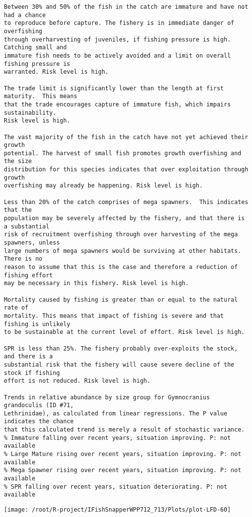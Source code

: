 \documentclass{report}\usepackage[]{graphicx}\usepackage[]{color}
\makeatletter
\def\maxwidth{ %
  \ifdim\Gin@nat@width>\linewidth
    \linewidth
  \else
    \Gin@nat@width
  \fi
}
\newenvironment{kframe}{%
 \def\at@end@of@kframe{}%
 \ifinner\ifhmode%
  \def\at@end@of@kframe{\end{minipage}}%
  \begin{minipage}{\columnwidth}%
 \fi\fi%
 \def\FrameCommand##1{\hskip\@totalleftmargin \hskip-\fboxsep
 \colorbox{shadecolor}{##1}\hskip-\fboxsep
     \hskip-\linewidth \hskip-\@totalleftmargin \hskip\columnwidth}%
 \MakeFramed {\advance\hsize-\width
   \@totalleftmargin\z@ \linewidth\hsize
   \@setminipage}}%
 {\par\unskip\endMakeFramed%
 \at@end@of@kframe}
\newenvironment{knitrout}{}{} %
\makeatother
\begin{document}
\begin{knitrout}
\begin{kframe}
\begin{verbatim}
Between 30% and 50% of the fish in the catch are immature and have not had a chance
to reproduce before capture. The fishery is in immediate danger of overfishing
through overharvesting of juveniles, if fishing pressure is high.  Catching small and
immature fish needs to be actively avoided and a limit on overall fishing pressure is
warranted. Risk level is high.

The trade limit is significantly lower than the length at first maturity.  This means
that the trade encourages capture of immature fish, which impairs sustainability.
Risk level is high.

The vast majority of the fish in the catch have not yet achieved their growth
potential. The harvest of small fish promotes growth overfishing and the size
distribution for this species indicates that over exploitation through growth
overfishing may already be happening. Risk level is high.

Less than 20% of the catch comprises of mega spawners.  This indicates that the
population may be severely affected by the fishery, and that there is a substantial
risk of recruitment overfishing through over harvesting of the mega spawners, unless
large numbers of mega spawners would be surviving at other habitats. There is no
reason to assume that this is the case and therefore a reduction of fishing effort
may be necessary in this fishery. Risk level is high.
 
Mortality caused by fishing is greater than or equal to the natural rate of
mortality. This means that impact of fishing is severe and that fishing is unlikely
to be sustainable at the current level of effort. Risk level is high.
 
SPR is less than 25%. The fishery probably over-exploits the stock, and there is a
substantial risk that the fishery will cause severe decline of the stock if fishing
effort is not reduced. Risk level is high.
 
Trends in relative abundance by size group for Gymnocranius grandoculis (ID #71,
Lethrinidae), as calculated from linear regressions. The P value indicates the chance
that this calculated trend is merely a result of stochastic variance.
% Immature falling over recent years, situation improving. P: not available
% Large Mature rising over recent years, situation improving. P: not available
% Mega Spawner rising over recent years, situation improving. P: not available
% SPR falling over recent years, situation deteriorating. P: not available
\end{verbatim}
\end{kframe}
\texttt{[image: /root/R-project/IFishSnapperWPP712\_713/Plots/plot-LFD-60]} 


\end{knitrout}
\end{document}
